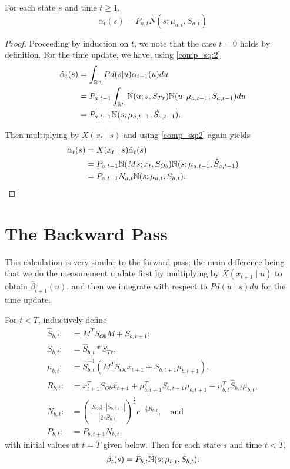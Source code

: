 \documentclass[12pt,leqno]{article}
\begin{document}
\begin{Thm}\label{alpha:1}
  For each state $s$ and time $t \ge 1$,
$$
  \alpha_t(s) = P_{a,t}N(s;\mu_{a,t},S_{a,t})
$$
\end{Thm}

\begin{proof}

Proceeding by induction on $t$, we note that the case $t = 0$ holds by definition.
For the time update, we have, using \eqref{comp_sq:2}
\begin{align}
  \hat{\alpha}_t(s) &= \int_{{\mathbb R}^n}Pd(s|u)\alpha_{t-1}(u)du \\\notag
  &= P_{a,t-1}\int_{{\mathbb R}^n}{\mathbb N}(u;s,S_{Tr}){\mathbb N}(u;\mu_{a,t-1},S_{a,t-1})du \notag\\
  &= P_{a,t-1}{\mathbb N}(s;\mu_{a,t-1},\hat{S}_{a,t-1}).
\end{align}

Then multiplying by $X(x_t\mid s)$ and using \eqref{comp_sq:2} again yields
\begin{align*}
  \alpha_t(s) &= X(x_t\mid s)\hat{\alpha}_t(s) \\
  &= P_{a,t-1}{\mathbb N}(Ms;x_t,S_{Ob}){\mathbb N}(s;\mu_{a,t-1},\hat{S}_{a,t-1}) \\
  &= P_{a,t-1}N_{a,t}{\mathbb N}(s;\mu_{a,t},S_{a,t}).
\end{align*}
\end{proof}

\section{The Backward Pass}
This calculation is very similar to the forward pass; the main difference being that we do
the measurement update first by multiplying by $X(x_{t+1}\mid u)$ to obtain $\hat{\beta}_{t+1}(u)$,
and then we integrate with respect to $Pd(u\mid s)du$ for the time update.  

\begin{Thm}\label{beta:1}
  For $t < T$, inductively define
\begin{align*}
  \hat{S}_{b,t} :&= M^TS_{Ob}M + S_{b,t+1};\\
  S_{b,t} :&= \hat{S}_{b,t}*S_{Tr},\\
  \mu_{b,t} :&= \hat{S}_{b,t}^{-1}(M^TS_{Ob}x_{t+1} + S_{b,t+1}\mu_{b,t+1}),\\
  R_{b,t} :&= x_{t+1}^TS_{Ob}x_{t+1} + \mu_{b,t+1}^TS_{b,t+1}\mu_{b,t+1} - \mu_{b,t}^T\hat{S}_{b,t}\mu_{b,t},\\
  N_{b,t} :&= \left(\frac{|S_{Ob}|\cdot|S_{b,t+1}|}{|2\pi\hat{S}_{b,t}|}\right)^{\frac{1}{2}}e^{-\frac{1}{2}R_{b,t}},\quad\text{and}\\
  P_{b,t}:&=P_{b,t+1}N_{b,t},
\end{align*}
with initial values at $t = T$ given below. Then for each state $s$ and time $t < T$,
$$
  \beta_t(s) = P_{b,t}{\mathbb N}(s;\mu_{b,t},S_{b,t}).
$$
\end{Thm}
\end{document}
